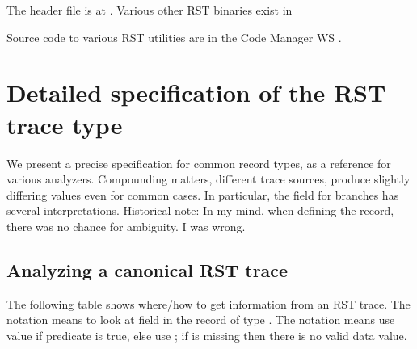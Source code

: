 \documentclass[10pt]{article}
\begin{document}
The  header file is at
.
Various other RST binaries exist in 

Source code to various RST utilities are in the Code Manager WS
.

\section{Detailed specification of the RST trace type}  

We present a precise specification for common record types, as a
reference for various analyzers.  Compounding matters, different trace
sources, produce slightly differing values even for common cases.  In
particular, the  field for branches has several
interpretations.  Historical note: In my mind, when defining the
 record, there was no chance for ambiguity.  I was
wrong.

\subsection{Analyzing a canonical RST trace}

The following table shows where/how to get information from an RST
trace.  The notation  means to look at field
 in the  record of type .  The
notation  means use value  if predicate
 is true, else use ; if  is missing
then there is no valid data value.
\end{document}
